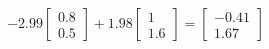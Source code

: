 \documentclass[preview]{standalone}
\begin{document}
\begin{align*}
-2.99 \begin{bmatrix} 0.8 \\ 0.5 \end{bmatrix} + 1.98 \begin{bmatrix} 1 \\ 1.6 \end{bmatrix} = \begin{bmatrix} -0.41 \\ 1.67 \end{bmatrix}
\end{align*}
\end{document}
